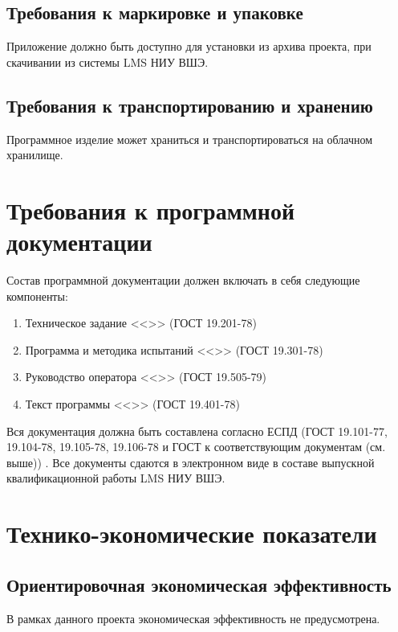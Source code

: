 \documentclass[a4paper,12pt,reqno]{article}
\begin{document}
    \subsection{Требования к маркировке и упаковке}
    Приложение должно быть доступно для установки из архива проекта, при скачивании из системы LMS НИУ ВШЭ.

    \subsection{Требования к транспортированию и хранению}
    Программное изделие может храниться и транспортироваться на облачном хранилище.
    \newpage


    \section{Требования к программной документации}
    Состав программной документации должен включать в себя следующие компоненты:
    \begin{enumerate}
        \item Техническое задание <<\unskip>> (ГОСТ 19.201-78) \label{tz}
        \item Программа и методика испытаний <<\unskip>> (ГОСТ 19.301-78) \label{pmi}
        \item Руководство оператора <<\unskip>> (ГОСТ 19.505-79) \label{ro}
        \item Текст программы <<\unskip>> (ГОСТ 19.401-78) \label{tp}
    \end{enumerate}

    \indent
    Вся документация должна быть составлена согласно ЕСПД (ГОСТ 19.101-77, 19.104-78, 19.105-78, 19.106-78 и ГОСТ к соответствующим документам (см. выше)) \cite{TZ:gost0, TZ:gost1, TZ:gost2, TZ:gost3, TZ:gost4, TZ:gost5, TZ:gost6, TZ:gost7, TZ:gost8, TZ:gost9}. Все документы сдаются в электронном виде в составе выпускной квалификационной работы LMS НИУ ВШЭ.
    \newpage


    \section{Технико-экономические показатели}

    \subsection{Ориентировочная экономическая эффективность}
    В рамках данного проекта экономическая эффективность не предусмотрена.
\end{document}
